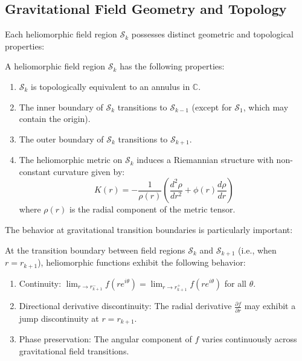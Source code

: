 \subsection{Gravitational Field Geometry and Topology}

Each heliomorphic field region $\mathcal{S}_k$ possesses distinct geometric and topological properties:

\begin{proposition}
A heliomorphic field region $\mathcal{S}_k$ has the following properties:
\begin{enumerate}
    \item $\mathcal{S}_k$ is topologically equivalent to an annulus in $\mathbb{C}$.
    \item The inner boundary of $\mathcal{S}_k$ transitions to $\mathcal{S}_{k-1}$ (except for $\mathcal{S}_1$, which may contain the origin).
    \item The outer boundary of $\mathcal{S}_k$ transitions to $\mathcal{S}_{k+1}$.
    \item The heliomorphic metric on $\mathcal{S}_k$ induces a Riemannian structure with non-constant curvature given by:
    \begin{equation}
    K(r) = -\frac{1}{\rho(r)}\left(\frac{d^2\rho}{dr^2} + \phi(r)\frac{d\rho}{dr}\right)
    \end{equation}
    where $\rho(r)$ is the radial component of the metric tensor.
\end{enumerate}
\end{proposition}

The behavior at gravitational transition boundaries is particularly important:

\begin{theorem}
At the transition boundary between field regions $\mathcal{S}_k$ and $\mathcal{S}_{k+1}$ (i.e., when $r = r_{k+1}$), heliomorphic functions exhibit the following behavior:
\begin{enumerate}
    \item Continuity: $\lim_{r \to r_{k+1}^-} f(re^{i\theta}) = \lim_{r \to r_{k+1}^+} f(re^{i\theta})$ for all $\theta$.
    \item Directional derivative discontinuity: The radial derivative $\frac{\partial f}{\partial r}$ may exhibit a jump discontinuity at $r = r_{k+1}$.
    \item Phase preservation: The angular component of $f$ varies continuously across gravitational field transitions.
\end{enumerate}
\end{theorem}

